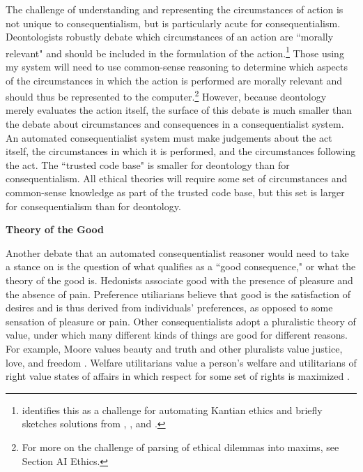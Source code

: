 \begin{isabellebody}
\begin{isamarkuptext}
The challenge of understanding and representing the circumstances of action is not unique to consequentialism,
but is particularly acute for consequentialism. Deontologists robustly debate which circumstances 
of an action are ``morally relevant" and should be included in the formulation of the action.\footnote{ 
\cite{powers} identifies this as a challenge for automating Kantian ethics and briefly sketches 
solutions from \citet{constofreason}, \citet{silber}, and \citet{rawlsconstructivism}. }
Those using my system will need to use common-sense reasoning to determine which aspects of the circumstances
in which the action is performed are morally relevant and should thus be represented to the computer.\footnote{For more on the challenge of 
parsing of ethical dilemmas into maxims, see Section AI Ethics.} However, because deontology
merely evaluates the action itself, the surface of this debate is much smaller
than the debate about circumstances and consequences in a consequentialist system. An automated 
consequentialist system must make judgements about the act itself, the circumstances in which 
it is performed, and the circumstances following the act. The ``trusted code base" is 
smaller for deontology than for consequentialism. All ethical theories will require some set of 
circumstances and common-sense knowledge as part of the trusted code base, but this set is larger for 
consequentialism than for deontology.%
\end{isamarkuptext}\isamarkuptrue%
%
\begin{isamarkuptext}%
\textbf{Theory of the Good}%
\end{isamarkuptext}\isamarkuptrue%
%
\begin{isamarkuptext}%
Another debate that an automated consequentialist reasoner would need to take a stance on is
the question of what qualifies as a ``good consequence," or what the theory of the good is. Hedonists associate
good with the presence of pleasure and the absence of pain. Preference utiliarians believe that good is 
the satisfaction of desires and is thus derived from individuals' preferences, as opposed to some
sensation of pleasure or pain. Other consequentialists adopt a pluralistic theory of value, under which 
many different kinds of things are good for different reasons. For example, Moore values beauty and truth 
and other pluralists value justice, love, and freedom \citep{moorepe}. Welfare utilitarians value a person's 
welfare and utilitarians of right value states of affairs in which respect for some set of
rights is maximized \citep{consequentialismsep}.


\end{isamarkuptext}
\end{isabellebody}
